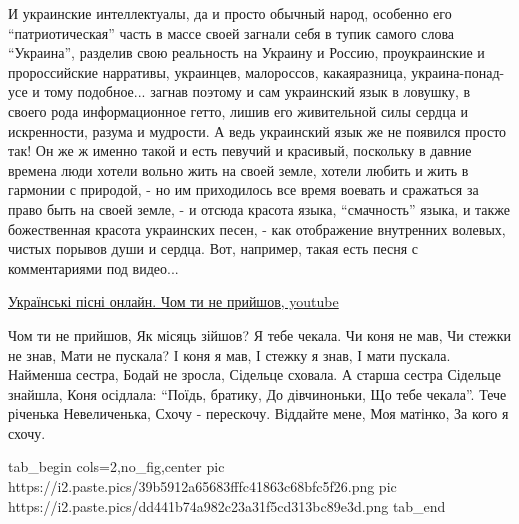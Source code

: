 И украинские интеллектуалы, да и просто обычный народ, особенно его
\enquote{патриотическая} часть в массе своей загнали себя в тупик самого слова
\enquote{Украина}, разделив свою реальность на Украину и Россию, проукраинские
и пророссийские нарративы, украинцев, малороссов, какаяразница,
украина-понад-усе и тому подобное... загнав поэтому и сам украинский язык в
ловушку, в своего рода информационное гетто, лишив его живительной силы сердца
и искренности, разума и мудрости. А ведь украинский язык же не появился просто
так! Он же ж именно такой и есть певучий и красивый, поскольку в давние времена
люди хотели вольно жить на своей земле, хотели любить и жить в гармонии с
природой, - но им приходилось все время воевать и сражаться за право быть на
своей земле, - и отсюда красота языка, \enquote{смачность} языка,  и также
божественная красота украинских песен, - как отображение внутренних волевых,
чистых порывов души и сердца. Вот, например, такая есть песня с комментариями
под видео... 

\href{https://www.youtube.com/watch?v=--iWRp8Jr6k}{%
Українські пісні онлайн. Чом ти не прийшов, youtube}

\raggedcolumns
\begin{multicols}{4} %
\setlength{\parindent}{0pt}
\obeycr
Чом ти не прийшов,
Як місяць зійшов?
Я тебе чекала.
Чи коня не мав,
Чи стежки не знав,
Мати не пускала?
\smallskip
І коня я мав,
І стежку я знав,
І мати пускала.
Найменша сестра,
Бодай не зросла,
Сідельце сховала.
\smallskip
А старша сестра
Сідельце знайшла,
Коня осідлала:
\enquote{Поїдь, братику,
До дівчиноньки,
Що тебе чекала}.
\smallskip
Тече річенька
Невеличенька,
Схочу - перескочу.
Віддайте мене,
Моя матінко,
За кого я схочу.
\restorecr
\end{multicols} %

\ifcmt
  tab_begin cols=2,no_fig,center
     pic https://i2.paste.pics/39b5912a65683fffc41863c68bfc5f26.png
		 pic https://i2.paste.pics/dd441b74a982c23a31f5cd313bc89e3d.png
  tab_end
\fi

